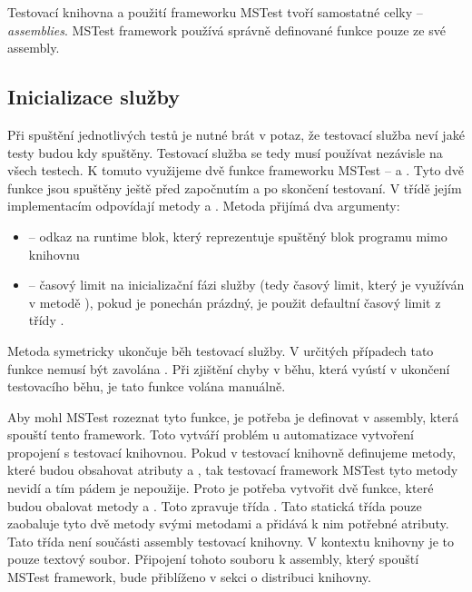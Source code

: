 Testovací knihovna a použití frameworku MSTest tvoří samostatné celky -- \textit{assemblies}. MSTest framework používá správně definované funkce pouze ze své assembly. 


\subsection{Inicializace služby}

Při spuštění jednotlivých testů je nutné brát v potaz, že testovací služba neví jaké testy budou kdy spuštěny. Testovací služba se tedy musí používat nezávisle na všech testech. K tomuto využijeme dvě funkce frameworku MSTest --  a . Tyto dvě funkce jsou spuštěny ještě před započnutím a po skončení testovaní. V třídě  jejím implementacím odpovídají metody  a . Metoda  přijímá dva argumenty:

\begin{itemize}
    \item {} -- odkaz na runtime blok, který reprezentuje spuštěný blok programu mimo knihovnu
    \item {} -- časový limit na inicializační fázi služby (tedy časový limit, který je využíván v metodě ), pokud je ponechán prázdný, je použit defaultní časový limit z třídy .
\end{itemize}

Metoda  symetricky ukončuje běh testovací služby. V určitých případech tato funkce nemusí být zavolána . Při zjištění chyby v běhu, která vyústí v ukončení testovacího běhu, je tato funkce volána manuálně.

Aby mohl MSTest rozeznat tyto funkce, je potřeba je definovat v assembly, která spouští tento framework. Toto vytváří problém u automatizace vytvoření propojení s testovací knihovnou. Pokud v testovací knihovně definujeme metody, které budou obsahovat atributy  a , tak testovací framework  MSTest tyto metody nevidí a tím pádem je nepoužije. Proto je potřeba vytvořit dvě funkce, které budou obalovat metody  a . Toto zpravuje třída . Tato statická třída pouze zaobaluje tyto dvě metody svými metodami a přidává k nim potřebné atributy. Tato třída není součásti assembly testovací knihovny. V kontextu knihovny je to pouze textový soubor. Připojení tohoto souboru k assembly, který spouští MSTest framework, bude přiblíženo v sekci o distribuci knihovny.


